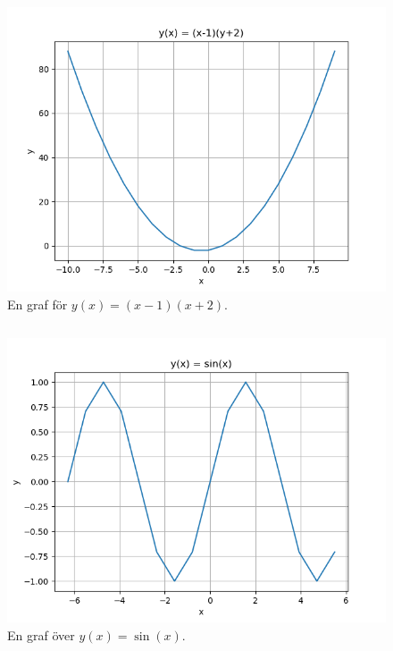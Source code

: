 \begin{frame}
  \begin{figure}
    \includegraphics[height=0.8\textheight]{fig/plot_f.png}
    \caption{En graf för \(y(x) = (x-1)(x+2)\).}
  \end{figure}
\end{frame}

\begin{frame}
  \inputminted[linenos,lastline=16]{python}{examples/plot_f.py}
\end{frame}

\begin{frame}
  \begin{figure}
    \includegraphics[height=0.8\textheight]{fig/plot_sin.png}
    \caption{En graf över \(y(x) = \sin(x)\).}
  \end{figure}
\end{frame}

\begin{frame}
  \inputminted[linenos,firstline=3,lastline=20]{python}{examples/plot_sin.py}
\end{frame}
